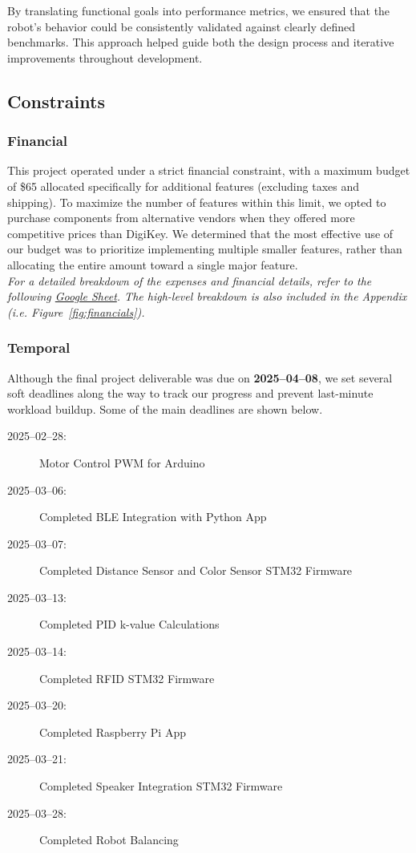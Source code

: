 \documentclass{article}
\begin{document}
By translating functional goals into performance metrics, we ensured that the robot's behavior could be consistently validated against clearly defined benchmarks.
This approach helped guide both the design process and iterative improvements throughout development.

\subsection{Constraints}

\subsubsection{Financial}
This project operated under a strict financial constraint, with a maximum budget of \$65 allocated specifically for additional
features (excluding taxes and shipping). To maximize the number of features within this limit, we opted to purchase components from alternative vendors when they offered more competitive prices than DigiKey. We determined that the most effective use of our budget was to prioritize implementing multiple smaller features,
rather than allocating the entire amount toward a single major feature. \\


\textit{For a detailed breakdown of the expenses and financial details, refer to the following \href{https://docs.google.com/spreadsheets/d/1k2FMDTlyxH50N65zvA1Ss5obWOlDuc3JaWVVDWrQ88E/edit?usp=sharing}{Google Sheet}.
The high-level breakdown is also included in the Appendix (i.e. Figure~\ref{fig:financials}).}

\subsubsection{Temporal}

Although the final project deliverable was due on \textbf{2025--04--08}, we set several soft deadlines along the way to track our progress
and prevent last-minute workload buildup. Some of the main deadlines are shown below.

\begin{minipage}{\linewidth}
    \begin{description}
        \item[2025--02--28:] Motor Control PWM for Arduino
        \item[2025--03--06:] Completed BLE Integration with Python App
        \item[2025--03--07:] Completed Distance Sensor and Color Sensor STM32 Firmware
        \item[2025--03--13:] Completed PID k-value Calculations
        \item[2025--03--14:] Completed RFID STM32 Firmware
        \item[2025--03--20:] Completed Raspberry Pi App
        \item[2025--03--21:] Completed Speaker Integration STM32 Firmware
        \item[2025--03--28:] Completed Robot Balancing
    \end{description}
\end{minipage}
\end{document}
